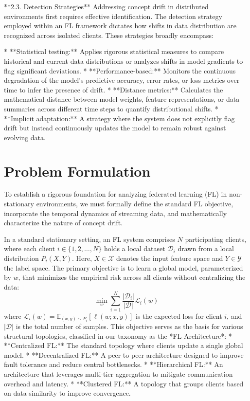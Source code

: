 \documentclass[journal]{IEEEtran}
\begin{document}
**2.3. Detection Strategies**
Addressing concept drift in distributed environments first requires effective identification. The detection strategy employed within an FL framework dictates how shifts in data distribution are recognized across isolated clients. These strategies broadly encompass:

*   **Statistical testing:** Applies rigorous statistical measures to compare historical and current data distributions or analyzes shifts in model gradients to flag significant deviations.
*   **Performance-based:** Monitors the continuous degradation of the model's predictive accuracy, error rates, or loss metrics over time to infer the presence of drift.
*   **Distance metrics:** Calculates the mathematical distance between model weights, feature representations, or data summaries across different time steps to quantify distributional shifts.
*   **Implicit adaptation:** A strategy where the system does not explicitly flag drift but instead continuously updates the model to remain robust against evolving data.

\section{Problem Formulation}
\label{sec:problem_formulation}

To establish a rigorous foundation for analyzing federated learning (FL) in non-stationary environments, we must formally define the standard FL objective, incorporate the temporal dynamics of streaming data, and mathematically characterize the nature of concept drift.

In a standard stationary setting, an FL system comprises $N$ participating clients, where each client $i \in \{1, 2, \dots, N\}$ holds a local dataset $\mathcal{D}_i$ drawn from a local distribution $P_i(X, Y)$. Here, $X \in \mathcal{X}$ denotes the input feature space and $Y \in \mathcal{Y}$ the label space. The primary objective is to learn a global model, parameterized by $w$, that minimizes the empirical risk across all clients without centralizing the data:
$$ \min_w \sum_{i=1}^N \frac{|\mathcal{D}_i|}{|\mathcal{D}|} \mathcal{L}_i(w) $$
where $\mathcal{L}_i(w) = \mathbb{E}_{(x,y) \sim P_i}[\ell(w; x, y)]$ is the expected loss for client $i$, and $|\mathcal{D}|$ is the total number of samples. This objective serves as the basis for various structural topologies, classified in our taxonomy as the *FL Architecture*:
*   **Centralized FL:** The standard topology where clients update a single global model.
*   **Decentralized FL:** A peer-to-peer architecture designed to improve fault tolerance and reduce central bottlenecks.
*   **Hierarchical FL:** An architecture that leverages multi-tier aggregation to mitigate communication overhead and latency.
*   **Clustered FL:** A topology that groups clients based on data similarity to improve convergence.
\end{document}
